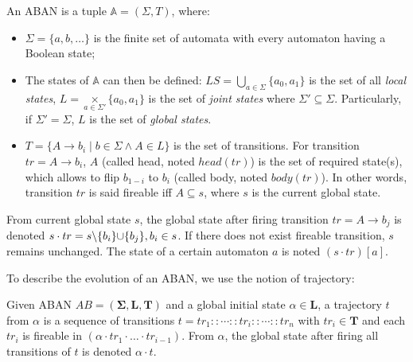 \documentclass[runningheads]{llncs}
\DeclarePairedDelimiter{\addset}{\cup\{}{\}}
\DeclarePairedDelimiter{\miset}{\setminus\{}{\}}
\begin{document}
\begin{definition}[ABAN]\label{def:ABAN}
An ABAN is a tuple $\mathbb{A} = (\Sigma,T)$, where:
\begin{itemize}
\item $\Sigma=\{a,b,\ldots\}$ is the finite set of automata with every automaton having a Boolean state;
\item The states of $\mathbb{A}$ can then be defined: $LS= \underset{a\in \Sigma}{\bigcup} \{a_0,a_1\}$ is the set of all \textit{local states}, $L= \underset{a\in \Sigma'}{\times} \{a_0,a_1\}$ is the set of \textit{joint states} where $\Sigma'\subseteq\Sigma$. Particularly, if $\Sigma'=\Sigma$, $L$ is the set of \textit{global states}. 
\item $T= \{A\rightarrow b_i\mid b\in \Sigma \land A\in L\}$ is the set of transitions.
For transition $tr=A\to b_i$, $A$ (called head, noted $head(tr)$) is the set of required state(s), which allows to flip $b_{1-i}$ to $b_i$ (called body, noted $body(tr)$). In other words, transition $tr$ is said fireable iff $A\subseteq s$, where $s$ is the current global state. 
\end{itemize}
\end{definition}

\begin{definition}[Dynamics]\label{def:ABANdynamics}
    From current global state $s$, the global state after firing transition $tr=A\to b_j$ is denoted $s \cdot tr = s \miset{b_i} \addset {b_j}, b_i \in s$.
    If there does not exist fireable transition, $s$ remains unchanged.
    The state of a certain automaton $a$ is noted $(s\cdot tr)[a]$.
\end{definition}
To describe the evolution of an ABAN, we use the notion of trajectory:
\begin{definition}[Trajectory]
Given ABAN $AB = (\mathbf{\Sigma},\mathbf{L},\mathbf{T})$ and a global initial state $\alpha\in \mathbf{L}$, a trajectory $t$ from $\alpha$ is a sequence of transitions $t=tr_1::\cdots :: tr_i::\cdots ::tr_n$ with $tr_i\in\mathbf{T}$ and each $tr_i$ is fireable in $(\alpha \cdot tr_1 \cdot \ldots \cdot tr_{i-1})$.
From $\alpha$, the global state after firing all transitions of $t$ is denoted $\alpha \cdot t$.
\end{definition}
\end{document}

